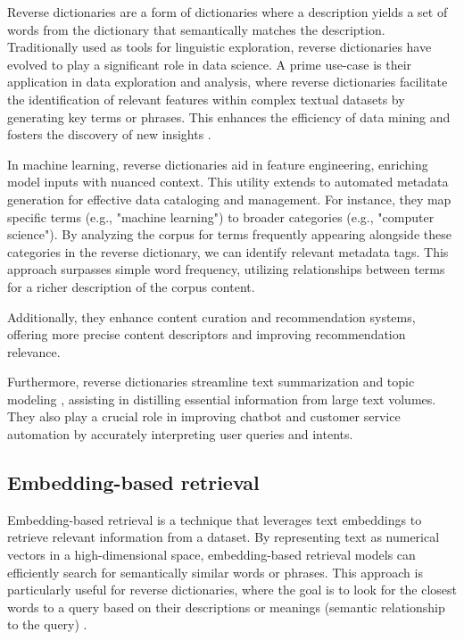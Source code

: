 \documentclass[12pt]{article}
\begin{document}
Reverse dictionaries are a form of dictionaries where a description yields a set of words from the dictionary that semantically matches the description. Traditionally used as tools for linguistic exploration, reverse dictionaries have evolved to play a significant role in data science. A prime use-case is their application in data exploration and analysis, where reverse dictionaries facilitate the identification of relevant features within complex textual datasets by generating key terms or phrases. This enhances the efficiency of data mining and fosters the discovery of new insights \cite{Chen2022}.

In machine learning, reverse dictionaries aid in feature engineering, enriching model inputs with nuanced context. This utility extends to automated metadata generation for effective data cataloging and management. For instance, they map specific terms (e.g., "machine learning") to broader categories (e.g., "computer science"). By analyzing the corpus for terms frequently appearing alongside these categories in the reverse dictionary, we can identify relevant metadata tags. This approach surpasses simple word frequency, utilizing relationships between terms for a richer description of the corpus content.

Additionally, they enhance content curation and recommendation systems, offering more precise content descriptors and improving recommendation relevance.

Furthermore, reverse dictionaries streamline text summarization and topic modeling \cite{Griffiths2004}, assisting in distilling essential information from large text volumes. They also play a crucial role in improving chatbot and customer service automation by accurately interpreting user queries and intents.

\subsection{Embedding-based retrieval}

Embedding-based retrieval is a technique that leverages text embeddings to retrieve relevant information from a dataset. By representing text as numerical vectors in a high-dimensional space, embedding-based retrieval models can efficiently search for semantically similar words or phrases. This approach is particularly useful for reverse dictionaries, where the goal is to look for the closest words to a query based on their descriptions or meanings (semantic relationship to the query) \cite{Huang2020}.
\end{document}
